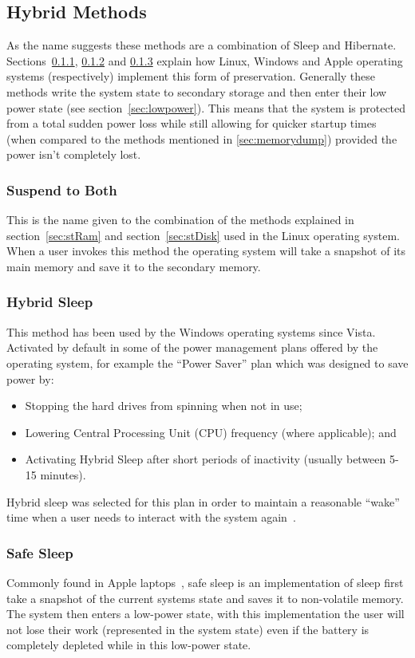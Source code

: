 \documentclass[a4paper,12pt]{article}
\begin{document}
\subsection{Hybrid Methods}
As the name suggests these methods are a combination of Sleep and Hibernate. Sections~\ref{sec:stBoth}, \ref{sec:hybridsleep} and \ref{sec:safesleep} explain how Linux, Windows and Apple operating systems (respectively) implement this form of preservation.
Generally these methods write the system state to secondary storage and then enter their low power state (see section~\ref{sec:lowpower}). This means that the system is protected from a total sudden power loss while still allowing for quicker startup times (when compared to the methods mentioned in \ref{sec:memorydump}) provided the power isn't completely lost. 
\subsubsection{Suspend to Both}\label{sec:stBoth}
This is the name given to the combination of the methods explained in section~\ref{sec:stRam} and section~\ref{sec:stDisk} used in the Linux operating system. When a user invokes this method the operating system will take a snapshot of its main memory and save it to the secondary memory.
\subsubsection{Hybrid Sleep}\label{sec:hybridsleep}
This method has been used by the Windows operating systems since Vista. Activated by default in some of the power management plans offered by the operating system, for example the ``Power Saver'' plan which was designed to save power by:
\begin{itemize}
    \item{Stopping the hard drives from spinning when not in use;}
    \item{Lowering Central Processing Unit (CPU) frequency (where applicable); and}
    \item{Activating Hybrid Sleep after short periods of inactivity (usually between 5-15 minutes).}
\end{itemize}
Hybrid sleep was selected for this plan in order to maintain a reasonable ``wake'' time when a user needs to interact with the system again~\citep{windowssleepandhibernation}.
\subsubsection{Safe Sleep}\label{sec:safesleep}
Commonly found in Apple laptops~\citep{safesleep}, safe sleep is an implementation of sleep first take a snapshot of the current systems state and saves it to non-volatile memory. The system then enters a low-power state, with this implementation the user will not lose their work (represented in the system state) even if the battery is completely depleted while in this low-power state.
\end{document}
